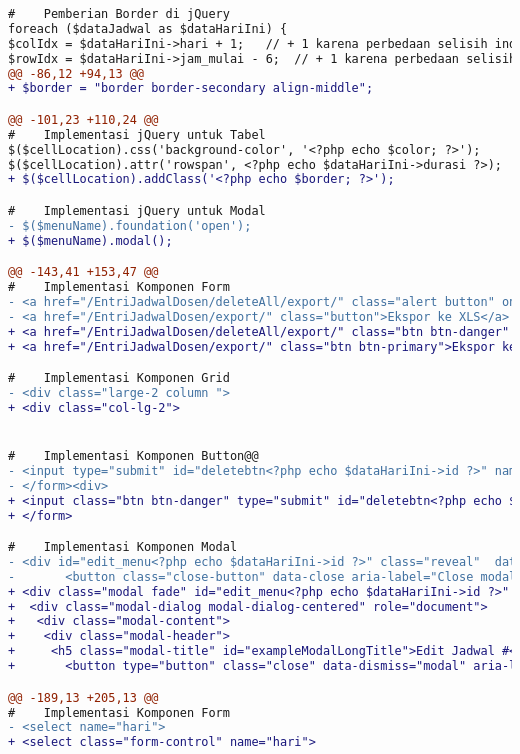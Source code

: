 \begin{lstlisting}[language=diff, caption=Kode untuk Halaman Entri Jadwal Dosen,  basicstyle=\ttfamily, frame=single,
columns=fullflexible, keepspaces=true, breaklines=true, label={lst:mainEntriJadwalDosen}]
#    Pemberian Border di jQuery
foreach ($dataJadwal as $dataHariIni) {
$colIdx = $dataHariIni->hari + 1;   // + 1 karena perbedaan selisih index tabel dan value hari di database 
$rowIdx = $dataHariIni->jam_mulai - 6;  // + 1 karena perbedaan selisih index tabel dan value jam_mulai di database 
@@ -86,12 +94,13 @@
+ $border = "border border-secondary align-middle";

@@ -101,23 +110,24 @@
#    Implementasi jQuery untuk Tabel
$($cellLocation).css('background-color', '<?php echo $color; ?>');
$($cellLocation).attr('rowspan', <?php echo $dataHariIni->durasi ?>);
+ $($cellLocation).addClass('<?php echo $border; ?>');

#    Implementasi jQuery untuk Modal
- $($menuName).foundation('open');
+ $($menuName).modal();

@@ -143,41 +153,47 @@
#    Implementasi Komponen Form
- <a href="/EntriJadwalDosen/deleteAll/export/" class="alert button" onClick="return konfirmasi();">Delete All</a>
- <a href="/EntriJadwalDosen/export/" class="button">Ekspor ke XLS</a>
+ <a href="/EntriJadwalDosen/deleteAll/export/" class="btn btn-danger" onClick="return konfirmasi();">Delete All</a>
+ <a href="/EntriJadwalDosen/export/" class="btn btn-primary">Ekspor ke XLS</a>

#    Implementasi Komponen Grid
- <div class="large-2 column ">
+ <div class="col-lg-2">


#    Implementasi Komponen Button@@
- <input type="submit" id="deletebtn<?php echo $dataHariIni->id ?>" name="deletebtn<?php echo $dataHariIni->id ?>" class="alert button" value="Delete">
- </form><div>
+ <input class="btn btn-danger" type="submit" id="deletebtn<?php echo $dataHariIni->id ?>" name="deletebtn<?php echo $dataHariIni->id ?>" value="Delete">
+ </form>

#    Implementasi Komponen Modal
- <div id="edit_menu<?php echo $dataHariIni->id ?>" class="reveal"  data-reveal >
- 		<button class="close-button" data-close aria-label="Close modal" type="button">
+ <div class="modal fade" id="edit_menu<?php echo $dataHariIni->id ?>" tabindex="-1" role="dialog" aria-hidden="true">
+  <div class="modal-dialog modal-dialog-centered" role="document">
+   <div class="modal-content">
+    <div class="modal-header">
+     <h5 class="modal-title" id="exampleModalLongTitle">Edit Jadwal #<?= $dataHariIni->id ?></h5>
+ 		<button type="button" class="close" data-dismiss="modal" aria-label="Close">

@@ -189,13 +205,13 @@
#    Implementasi Komponen Form
- <select name="hari"> 
+ <select class="form-control" name="hari">


\end{lstlisting}
